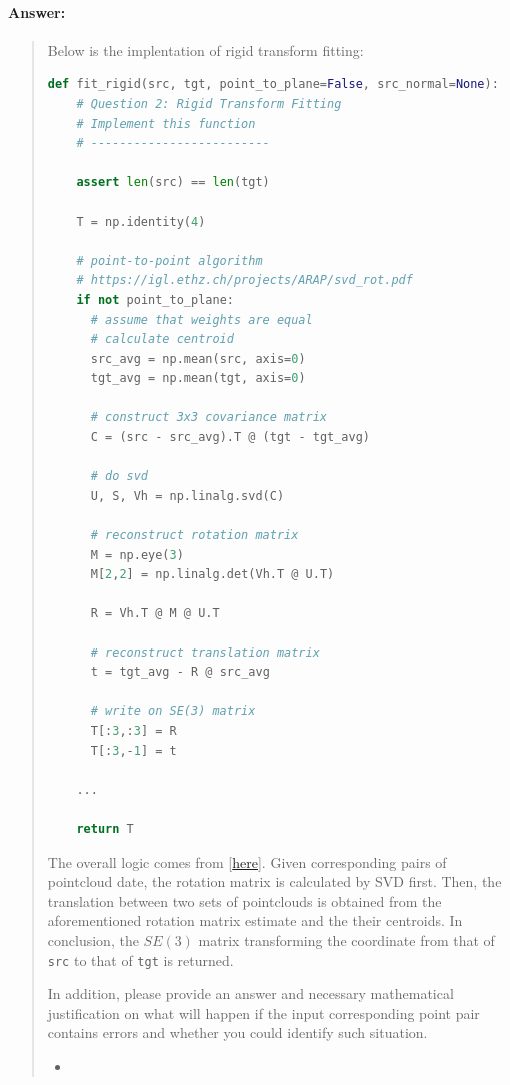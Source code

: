\documentclass[11pt]{article}
\begin{document}
\paragraph{Answer:} 
\begin{quote}

Below is the implentation of rigid transform fitting:

\begin{lstlisting}[language=Python, basicstyle=\scriptsize]
def fit_rigid(src, tgt, point_to_plane=False, src_normal=None):
    # Question 2: Rigid Transform Fitting
    # Implement this function
    # -------------------------
  
    assert len(src) == len(tgt)
  
    T = np.identity(4)
    
    # point-to-point algorithm
    # https://igl.ethz.ch/projects/ARAP/svd_rot.pdf
    if not point_to_plane:
      # assume that weights are equal
      # calculate centroid
      src_avg = np.mean(src, axis=0)
      tgt_avg = np.mean(tgt, axis=0)
      
      # construct 3x3 covariance matrix
      C = (src - src_avg).T @ (tgt - tgt_avg)
      
      # do svd 
      U, S, Vh = np.linalg.svd(C)
      
      # reconstruct rotation matrix
      M = np.eye(3)
      M[2,2] = np.linalg.det(Vh.T @ U.T)
      
      R = Vh.T @ M @ U.T
  
      # reconstruct translation matrix
      t = tgt_avg - R @ src_avg
      
      # write on SE(3) matrix
      T[:3,:3] = R
      T[:3,-1] = t
    
    ...
    
    return T
\end{lstlisting}

The overall logic comes from [\href{https://igl.ethz.ch/projects/ARAP/svd_rot.pdf}{here}]. Given corresponding pairs of pointcloud date, the rotation matrix is calculated by SVD first. Then, the translation between two sets of pointclouds is obtained from the aforementioned rotation matrix estimate and the their centroids. In conclusion, the $SE(3)$ matrix transforming the coordinate from that of \texttt{src} to that of \texttt{tgt} is returned.

\color{red}
In addition, please provide an answer and necessary mathematical justification on what will happen if the input corresponding point pair contains errors and whether you could identify such situation.

\begin{itemize}
    \item 
\end{itemize}

\end{quote}
\end{document}
